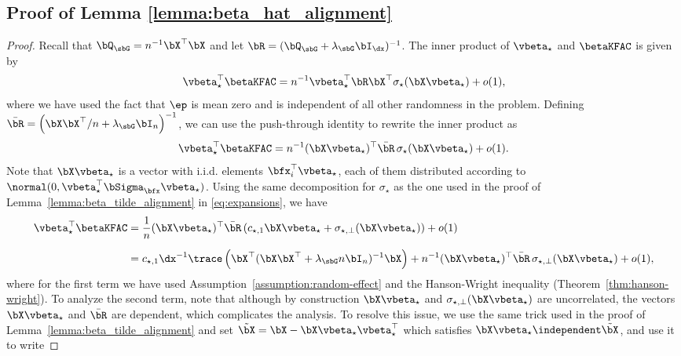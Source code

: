 \subsection{Proof of Lemma \ref{lemma:beta_hat_alignment}}
\label{pf_lemma:beta_hat_alignment}
\HatAlignment*
\begin{proof}
    
    Recall that $\bQ_\sbG = n^{-1} \bX^\top \bX$ and let $\bR = (\bQ_\sbG + \lambda_\sbG \bI_{\dx})^{-1}$. The inner product of $\vbeta_\star$ and $\betaKFAC$ is given by
    \begin{align*}
        \vbeta_\star^\top\betaKFAC = n^{-1} \vbeta_\star^\top\bR\bX^\top \sigma_\star(\bX\vbeta_\star) + o(1),
    \end{align*}
    where we have used the fact that $\boldsymbol{\ep}$ is mean zero and is independent of all other randomness in the problem. Defining $\bar\bR =\left( \bX \bX^\top/n + \lambda_\sbG \bI_n\right)^{-1}$, we can use the push-through identity to rewrite the inner product as
    \begin{align*}
        \vbeta_\star^\top\betaKFAC = n^{-1}(\bX\vbeta_\star)^\top\bar\bR\,\sigma_\star(\bX\vbeta_\star) + o(1).
    \end{align*}
    Note that $\bX\vbeta_\star$ is a vector with i.i.d. elements $\bfx_i^\top \vbeta_\star$, each of them distributed according to $\normal(0, \vbeta_\star^\top \bSigma_\bfx\vbeta_\star)$.  Using the same decomposition for $\sigma_\star$ as the one used in the proof of Lemma~\ref{lemma:beta_tilde_alignment} in \eqref{eq:expansions}, we have
    \begin{align}
    \label{eq:inner_hat}
    \vbeta_\star^\top\betaKFAC &= \frac{1}{n} (\bX\vbeta_\star)^\top \bar\bR\left(c_{\star,1} \bX \vbeta_\star + \sigma_{\star, \perp}(\bX\vbeta_\star)\right) + o(1)\nonumber\\[0.2cm]
    &= c_{\star,1} \dx^{-1} \trace\left(\bX^\top (\bX\bX^\top + \lambda_\sbG n \bI_n)^{-1}\bX\right) + n^{-1} (\bX\vbeta_\star)^\top \bar\bR\, \sigma_{\star, \perp}(\bX\vbeta_\star)+ o(1),
    \end{align}
    where for the first term we have used Assumption~\ref{assumption:random-effect} and the Hanson-Wright inequality (Theorem~\ref{thm:hanson-wright}). To analyze the second term, note that although by construction $\bX\vbeta_\star$ and $\sigma_{\star, \perp}(\bX\vbeta_\star)$ are uncorrelated, the vectors $\bX\vbeta_\star$ and $\bar\bR$ are dependent, which complicates the analysis. To resolve this issue, we use the same trick used in the proof of Lemma~\ref{lemma:beta_tilde_alignment} and set $\tilde \bX = \bX - \bX \vbeta_\star\vbeta_\star^\top$ which satisfies $\bX\vbeta_\star \independent \tilde\bX$, and use it to write

\end{proof}

